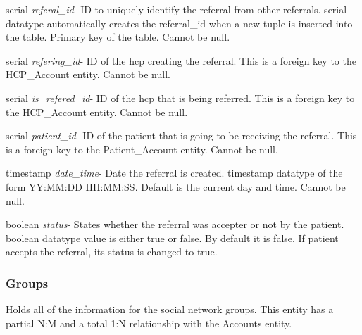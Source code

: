 \begin{description}
\item serial \textit{referal\_id}-  ID to uniquely identify the referral from other referrals. serial datatype automatically creates the referral\_id when a new tuple is inserted into the table.  Primary key of the table.  Cannot be null.
\item serial \textit{refering\_id}- ID of the hcp creating the referral.  This is a foreign key to the HCP\_Account entity.  Cannot be null.
\item serial \textit{is\_refered\_id}- ID of the hcp that is being referred.  This is a foreign key to the HCP\_Account entity.  Cannot be null.
\item serial \textit{patient\_id}- ID of the patient that is going to be receiving the referral.  This is a foreign key to the Patient\_Account entity.  Cannot be null.
\item timestamp \textit{date\_time}-  Date the referral is created.  timestamp datatype of the form YY:MM:DD HH:MM:SS.  Default is the current day and time.  Cannot be null.
\item boolean \textit{status}- States whether the referral was accepter or not by the patient.  boolean datatype value is either true or false.  By default it is false.  If patient accepts the referral, its status is changed to true.
\end{description}

\subsubsection{Groups}
Holds all of the information for the social network groups.  This entity has a partial N:M and a total 1:N relationship with the Accounts entity.

